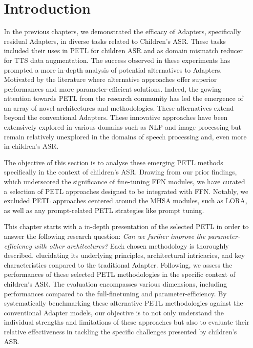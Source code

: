\label{chap:7}
\cleardoublepage
\section{Introduction}
In the previous chapters, we demonstrated the efficacy of Adapters, specifically residual Adapters, in diverse tasks related to Children's ASR. These tasks included their uses in PETL for children ASR and as domain mismatch reducer for TTS data augmentation. The success observed in these experiments has prompted a more in-depth analysis of potential alternatives to Adapters. Motivated by the literature where alternative approaches offer superior performances and more parameter-efficient solutions.
Indeed, the gowing attention towards PETL from the research community has led the emergence of an array of novel architectures and methodologies. These alternatives extend beyond the conventional Adapters. These innovative approaches have been extensively explored in various domains such as NLP and image processing but remain relatively unexplored in the domains of speech processing and, even more in children's ASR.

The objective of this section is to analyse these emerging PETL methods specifically in the context of children's ASR. Drawing from our prior findings, which underscored the significance of fine-tuning FFN modules, we have curated a selection of PETL approaches designed to be integrated with FFN. Notably, we excluded PETL approaches centered around the MHSA modules, such as LORA, as well as any prompt-related PETL strategies like prompt tuning.

This chapter starts with a in-depth presentation of the selected PETL in order to answer the following research question: \textit{Can we further improve the parameter-efficiency with other architectures? } Each chosen methodology is thoroughly described, elucidating its underlying principles, architectural intricacies, and key characteristics conpared to the traditional Adapter. 
Following, we assess the performances of these selected PETL methodologies  in the specific context of children's ASR. The evaluation encompasses various dimensions, including performances compared to the full-finetuning and parameter-efficiency. By systematically benchmarking these alternative PETL methodologies against the conventional Adapter models, our objective is to not only understand the individual strengths and limitations of these approaches but also to evaluate their relative effectiveness in tackling the specific challenges presented by children's ASR.

